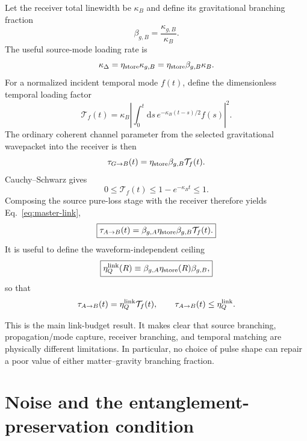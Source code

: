 \documentclass[11pt]{article}
\newcommand{\dd}{\mathrm{d}}
\begin{document}
Let the receiver total linewidth be $\kappa_B$ and define its gravitational branching fraction
\begin{equation}
\boxed{
\beta_{g,B}=\frac{\kappa_{g,B}}{\kappa_B}.
}
\label{eq:receiver-beta}
\end{equation}
The useful source-mode loading rate is
\begin{equation}
\kappa_\Delta
=\eta_{\rm store}\kappa_{g,B}
=\eta_{\rm store}\beta_{g,B}\kappa_B.
\label{eq:kdelta}
\end{equation}
For a normalized incident temporal mode $f(t)$, define the dimensionless temporal loading factor
\begin{equation}
\boxed{
\mathcal T_f(t)
=\kappa_B
\left|
\int_0^t\dd s\,
 e^{-\kappa_B(t-s)/2}f(s)
\right|^2.
}
\label{eq:Tf}
\end{equation}
The ordinary coherent channel parameter from the selected gravitational wavepacket into the receiver is then
\begin{equation}
\tau_{G\to B}(t)
=\eta_{\rm store}\beta_{g,B}\mathcal T_f(t).
\end{equation}
Cauchy--Schwarz gives
\begin{equation}
0\le\mathcal T_f(t)\le1-e^{-\kappa_Bt}\le1.
\label{eq:Tbound}
\end{equation}
Composing the source pure-loss stage with the receiver therefore yields Eq.~\eqref{eq:master-link},
\begin{equation}
\boxed{
\tau_{A\to B}(t)
=\beta_{g,A}\eta_{\rm store}\beta_{g,B}\mathcal T_f(t).
}
\end{equation}
It is useful to define the waveform-independent ceiling
\begin{equation}
\boxed{
\eta_Q^{\rm link}(R)
\equiv
\beta_{g,A}\eta_{\rm store}(R)\beta_{g,B},
}
\label{eq:etaQ}
\end{equation}
so that
\begin{equation}
\tau_{A\to B}(t)=\eta_Q^{\rm link}\mathcal T_f(t),
\qquad
\tau_{A\to B}(t)\le\eta_Q^{\rm link}.
\end{equation}

This is the main link-budget result. It makes clear that source branching, propagation/mode capture, receiver branching, and temporal matching are physically different limitations. In particular, no choice of pulse shape can repair a poor value of either matter--gravity branching fraction.

\section{Noise and the entanglement-preservation condition}
\label{sec:noise}
\end{document}
